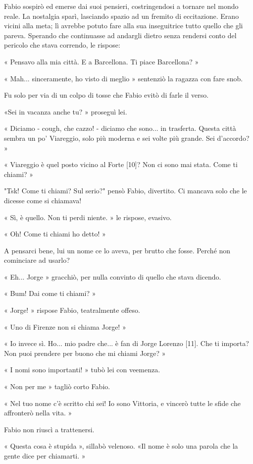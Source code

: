 Fabio sospirò ed emerse dai suoi pensieri, costringendosi a tornare nel mondo reale. La nostalgia sparì, lasciando spazio ad un fremito di eccitazione. Erano vicini alla meta; lì avrebbe potuto fare alla sua inseguitrice tutto quello che gli pareva. Sperando che continuasse ad andargli dietro senza rendersi conto del pericolo che stava correndo, le rispose:

« Pensavo alla mia città. E a Barcellona. Ti piace Barcellona? »

« Mah... sinceramente, ho visto di meglio » sentenziò la ragazza con fare snob.

Fu solo per via di un colpo di tosse che Fabio evitò di farle il verso.

«Sei in vacanza anche tu? » proseguì lei.

« Diciamo - cough, che cazzo! - diciamo che sono... in trasferta. Questa città sembra un po' Viareggio, solo più moderna e sei volte più grande. Sei d'accordo? »

« Viareggio è quel posto vicino al Forte [10]? Non ci sono mai stata. Come ti chiami? »

"Tsk! Come ti chiami? Sul serio?" pensò Fabio, divertito. Ci mancava solo che le dicesse come si chiamava!

« Sì, è quello. Non ti perdi niente. » le rispose, evasivo.

« Oh! Come ti chiami ho detto! »

A pensarci bene, lui un nome ce lo aveva, per brutto che fosse. Perché non cominciare ad usarlo?

« Eh... Jorge » gracchiò, per nulla convinto di quello che stava dicendo.

« Bum! Dai come ti chiami? »

« Jorge! » rispose Fabio, teatralmente offeso.

« Uno di Firenze non si chiama Jorge! »

« Io invece sì. Ho... mio padre che... è fan di Jorge Lorenzo [11]. Che ti importa? Non puoi prendere per buono che mi chiami Jorge? »

« I nomi sono importanti! » tubò lei con veemenza.

« Non per me » tagliò corto Fabio.

« Nel tuo nome c'è scritto chi sei! Io sono Vittoria, e vincerò tutte le sfide che affronterò nella vita. »

Fabio non riuscì a trattenersi.

« Questa cosa è stupida », sillabò velenoso. «Il nome è solo una parola che la gente dice per chiamarti. »

